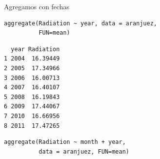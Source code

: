 \documentclass[xcolor={usenames,svgnames,dvipsnames}]{beamer}
\begin{document}
\begin{frame}[fragile,label=sec-5-3-4]{Agregamos con fechas}
 \lstset{language=R,label= ,caption= ,numbers=none}
\begin{lstlisting}
aggregate(Radiation ~ year, data = aranjuez,
          FUN=mean)
\end{lstlisting}

\begin{verbatim}
  year Radiation
1 2004  16.39449
2 2005  17.34966
3 2006  16.00713
4 2007  16.40107
5 2008  16.19843
6 2009  17.44067
7 2010  16.66956
8 2011  17.47265
\end{verbatim}

\lstset{language=R,label= ,caption= ,numbers=none}
\begin{lstlisting}
aggregate(Radiation ~ month + year,
          data = aranjuez, FUN=mean)
\end{lstlisting}


\end{frame}
\end{document}
